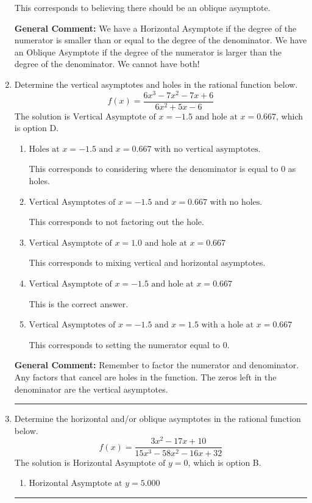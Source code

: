 \documentclass{extbook}[14pt]
\newcommand{\litem}[1]{\item #1

\rule{\textwidth}{0.4pt}}
\begin{document}
\begin{enumerate}
{\begin{enumerate}[label=\Alph*.]
This corresponds to believing there should be an oblique asymptote.
\end{enumerate}

\textbf{General Comment:} We have a Horizontal Asymptote if the degree of the numerator is smaller than or equal to the degree of the denominator. We have an Oblique Asymptote if the degree of the numerator is larger than the degree of the denominator. We cannot have both!
}
\litem{
Determine the vertical asymptotes and holes in the rational function below.
\[ f(x) = \frac{6x^{3} -7 x^{2} -7 x + 6}{6x^{2} +5 x -6} \]The solution is \( \text{Vertical Asymptote of } x = -1.5 \text{ and hole at } x = 0.667 \), which is option D.\begin{enumerate}[label=\Alph*.]
\item \( \text{Holes at } x = -1.5 \text{ and } x = 0.667 \text{ with no vertical asymptotes.} \)

This corresponds to considering where the denominator is equal to 0 as holes.
\item \( \text{Vertical Asymptotes of } x = -1.5 \text{ and } x = 0.667 \text{ with no holes.} \)

This corresponds to not factoring out the hole.
\item \( \text{Vertical Asymptote of } x = 1.0 \text{ and hole at } x = 0.667 \)

This corresponds to mixing vertical and horizontal asymptotes.
\item \( \text{Vertical Asymptote of } x = -1.5 \text{ and hole at } x = 0.667 \)

This is the correct answer.
\item \( \text{Vertical Asymptotes of } x = -1.5 \text{ and } x = 1.5 \text{ with a hole at } x = 0.667 \)

This corresponds to setting the numerator equal to 0.
\end{enumerate}

\textbf{General Comment:} Remember to factor the numerator and denominator. Any factors that cancel are holes in the function. The zeros left in the denominator are the vertical asymptotes.
}
\litem{
Determine the horizontal and/or oblique asymptotes in the rational function below.
\[ f(x) = \frac{3x^{2} -17 x + 10}{15x^{3} -58 x^{2} -16 x + 32} \]The solution is \( \text{Horizontal Asymptote of } y = 0 \), which is option B.\begin{enumerate}[label=\Alph*.]
\item \( \text{Horizontal Asymptote at } y = 5.000 \)


\end{enumerate}}
\end{enumerate}
\end{document}
